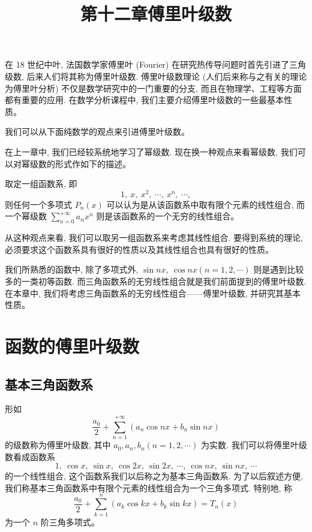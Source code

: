 \documentclass[UTF8,12pt,a4paper,fontset=fandol]{ctexart}
\title{第十二章\quad 傅里叶级数}
\author{}
\date{}
\begin{document}
\maketitle

在 18 世纪中叶, 法国数学家傅里叶 (Fourier) 在研究热传导问题时首先引进了三角级数, 后来人们将其称为傅里叶级数. 傅里叶级数理论 (人们后来称与之有关的理论为傅里叶分析) 不仅是数学研究中的一门重要的分支, 而且在物理学、工程等方面都有重要的应用. 在数学分析课程中, 我们主要介绍傅里叶级数的一些最基本性质。

我们可以从下面纯数学的观点来引进傅里叶级数。

在上一章中, 我们已经较系统地学习了幂级数. 现在换一种观点来看幂级数, 我们可以对幂级数的形式作如下的描述。

取定一组函数系, 即
\[
  1,\ x,\ x^2,\ \cdots,\ x^n,\ \cdots,
\]
则任何一个多项式 $P_n(x)$ 可以认为是从该函数系中取有限个元素的线性组合, 而一个幂级数 $\sum\limits_{n=0}^{+\infty}a_nx^n$ 则是该函数系的一个无穷的线性组合。

从这种观点来看, 我们可以取另一组函数系来考虑其线性组合. 要得到系统的理论, 必须要求这个函数系具有很好的性质以及其线性组合也具有很好的性质。

我们所熟悉的函数中, 除了多项式外, $\sin nx,\ \cos nx(n=1,2,\cdots)$ 则是遇到比较多的一类初等函数. 而三角函数系的无穷线性组合就是我们前面提到的傅里叶级数. 在本章中, 我们将考虑三角函数系的无穷线性组合——傅里叶级数, 并研究其基本性质。

\section{函数的傅里叶级数}

\subsection{基本三角函数系}

形如
\[
  \frac{a_0}{2}+\sum_{n=1}^{+\infty}(a_n\cos nx+b_n\sin nx)
\]
的级数称为傅里叶级数, 其中 $a_0,a_n,b_n(n=1,2,\cdots)$ 为实数. 我们可以将傅里叶级数看成函数系
\begin{equation}
  1,\ \cos x,\ \sin x,\ \cos 2x,\ \sin 2x,\ \cdots,\ \cos nx,\ \sin nx,\ \cdots
  \tag{12.1.1}
\end{equation}
的一个线性组合, 这个函数系我们以后称之为基本三角函数系. 为了以后叙述方便, 我们称基本三角函数系中有限个元素的线性组合为一个三角多项式. 特别地, 称
\[
  \frac{a_0}{2}+\sum_{k=1}^n(a_k\cos kx+b_k\sin kx)=T_n(x)
\]
为一个 $n$ 阶三角多项式。
\end{document}
